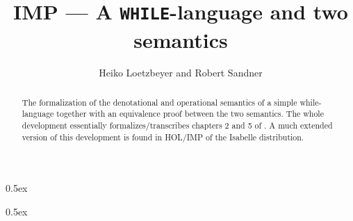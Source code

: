 \documentclass[a4wide]{article}
\begin{document}
\title{IMP --- A {\tt WHILE}-language and two semantics}
\author{Heiko Loetzbeyer and Robert Sandner}
\maketitle

\parindent 0pt\parskip 0.5ex

\begin{abstract}\noindent
  The formalization of the denotational and operational semantics of a simple
  while-language together with an equivalence proof between the two semantics.
  The whole development essentially formalizes/transcribes chapters 2 and 5 of
  \cite{Winskel}.  A much extended version of this development is found in
  HOL/IMP of the Isabelle distribution.
\end{abstract}

\tableofcontents

\parindent 0pt\parskip 0.5ex




\end{document}
